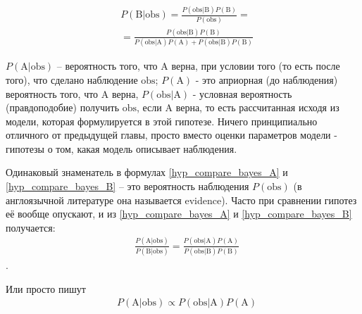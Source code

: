 \documentclass{book}
\begin{document}
\begin{align}\label{hyp_compare_bayes_B}
   &P\left(\text{B|obs}\right)=
   \frac{P\left(\text{obs|B}\right) P\left(\text{B}\right)}{P\left(\text{obs}\right)} = \nonumber \\
   &=\frac{P\left(\text{obs|B}\right) P\left(\text{B}\right)}{P\left(\text{obs|A}\right) P\left(\text{A}\right)+P\left(\text{obs|B}\right) P\left(\text{B}\right)}
\end{align}


$P\left(\text{A|obs}\right)$ -- вероятность того, что $\text{A}$ верна, при условии того (то есть после того), что сделано наблюдение $\text{obs}$; $P\left(\text{A}\right)$ - это априорная (до наблюдения) вероятность того, что $\text{A}$ верна, $P\left(\text{obs|A}\right)$ - условная вероятность (правдоподобие) получить $\text{obs}$, если $\text{A}$ верна, то есть рассчитанная исходя из модели, которая формулируется в этой гипотезе. Ничего принципиально отличного от предыдущей главы, просто вместо оценки параметров модели - гипотезы о том, какая модель описывает наблюдения.

Одинаковый знаменатель в формулах \eqref{hyp_compare_bayes_A} и \eqref{hyp_compare_bayes_B} -- это вероятность наблюдения $P\left(\text{obs}\right)$ (в англоязычной литературе она называется evidence). Часто при сравнении гипотез её вообще опускают, и из \eqref{hyp_compare_bayes_A} и \eqref{hyp_compare_bayes_B} получается:
\begin{align}\label{hyp_compare_bayes_comp}
   &\frac{P\left(\text{A|obs}\right)}{P\left(\text{B|obs}\right)}=\frac{P\left(\text{obs|A}\right) P\left(\text{A}\right)}{P\left(\text{obs|B}\right) P\left(\text{B}\right)}
\end{align}.

Или просто пишут 
\begin{align}\label{hyp_compare_bayes_null_prop}
   &P\left(\text{A|obs}\right)\propto P\left(\text{obs|A}\right) P\left(\text{A}\right)
\end{align}
\end{document}
